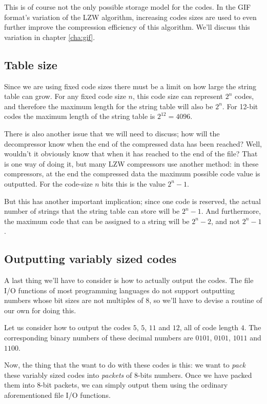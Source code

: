 This is of course not the only possible storage model for the
codes. In the GIF format's variation of the LZW algorithm, increasing
codes sizes are used to even further improve the compression
efficiency of this algorithm. We'll discuss this variation in chapter
\ref{cha:gif}.

\subsection{Table size}

Since we are using fixed code sizes there must be a limit on how large
the string table can grow. For any fixed code size $n$, this code size
can represent $2^n$ codes, and therefore the maximum length for the
string table will also be $2^n$. For 12-bit codes the maximum length
of the string table is $2^{12}=4096$.

There is also another issue that we will need to discuss; how will the
decompressor know when the end of the compressed data has been
reached? Well, wouldn't it obviously know that when it has reached to
the end of the file? That is one way of doing it, but many LZW
compressors use another method: in these compressors, at the end the
compressed data the maximum possible code value is outputted. For the
code-size $n$ bits this is the value $2^n - 1$.

But this has another important implication; since one code is
reserved, the actual number of strings that the string table can store
will be $2^n - 1$. And furthermore, the maximum code that can be
assigned to a string will be $2^n - 2$, and not $2^n - 1$.

\subsection{Outputting variably sized codes}

A last thing we'll have to consider is how to actually output the
codes. The file I/O functions of most programming languages do not
support outputting numbers whose bit sizes are not multiples of 8, so
we'll have to devise a routine of our own for doing this.

Let us consider how to output the codes $5$, $5$, $11$ and $12$, all
of code length $4$. The corresponding binary numbers of these decimal
numbers are $0101$, $0101$, $1011$ and $1100$.

Now, the thing that the want to do with these codes is this: we want
to \textit{pack} these variably sized codes into \textit{packets} of
8-bits numbers. Once we have packed them into 8-bit packets, we can
simply output them using the ordinary aforementioned file I/O
functions.

